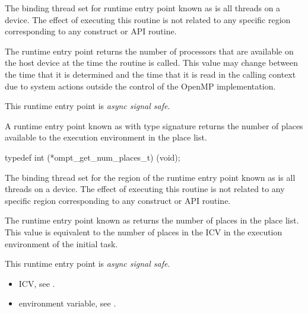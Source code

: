 \binding

The binding thread set for runtime entry point known as
 is all threads on a device. The effect
of executing this routine is not related to any specific region
corresponding to any construct or API routine.

\descr
The  runtime entry point returns the
number of processors that are available on the host device at the time
the routine is called. This value may change between the time that
it is determined and the time that it is read in the calling context due to
system actions outside the control of the OpenMP implementation.

This runtime entry point is \emph{async signal safe}.


\label{sec:ompt_get_num_places_t}
\label{sec:ompt_get_num_place}

\summary

A runtime entry point known as
 with type signature
  returns
the number of places available to the execution
environment in the place list.

\format

\begin{ccppspecific}
\begin{omptInquiry}
typedef int (*ompt_get_num_places_t) (void);
\end{omptInquiry}
\end{ccppspecific}


\binding

The binding thread set for the region
of the runtime entry point known as 
is all threads on a device. The effect of executing this
routine is not related to any specific region corresponding
to any construct or API routine.

\descr

The runtime entry point known as  
returns the number of places in the place list.
This value is equivalent to the number of places in
the   ICV in the execution environment
of the initial task.

This runtime entry point is \emph{async signal safe}.

\crossreferences
\begin{itemize}
\item {} ICV, see
.

\item {} environment variable, see
.
\end{itemize}




